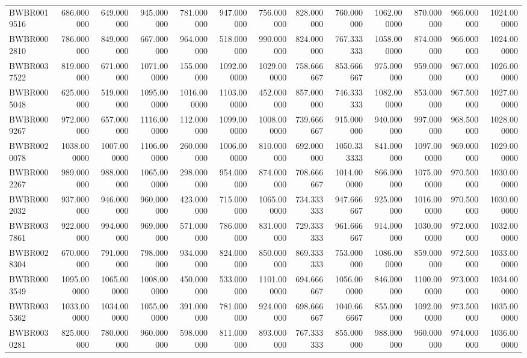 \begin{longtable}{lrrrrrrrrrrrr}
BWBR0019516 & 686.000000 & 649.000000 & 945.000000 & 781.000000 & 947.000000 & 756.000000 & 828.000000 & 760.000000 & 1062.000000 & 870.000000 & 966.000000 & 1024.000000 \\
BWBR0002810 & 786.000000 & 849.000000 & 667.000000 & 964.000000 & 518.000000 & 990.000000 & 824.000000 & 767.333333 & 1058.000000 & 874.000000 & 966.000000 & 1024.000000 \\
BWBR0037522 & 819.000000 & 671.000000 & 1071.000000 & 155.000000 & 1092.000000 & 1029.000000 & 758.666667 & 853.666667 & 975.000000 & 959.000000 & 967.000000 & 1026.000000 \\
BWBR0005048 & 625.000000 & 519.000000 & 1095.000000 & 1016.000000 & 1103.000000 & 452.000000 & 857.000000 & 746.333333 & 1082.000000 & 853.000000 & 967.500000 & 1027.000000 \\
BWBR0009267 & 972.000000 & 657.000000 & 1116.000000 & 112.000000 & 1099.000000 & 1008.000000 & 739.666667 & 915.000000 & 940.000000 & 997.000000 & 968.500000 & 1028.000000 \\
BWBR0020078 & 1038.000000 & 1007.000000 & 1106.000000 & 260.000000 & 1006.000000 & 810.000000 & 692.000000 & 1050.333333 & 841.000000 & 1097.000000 & 969.000000 & 1029.000000 \\
BWBR0002267 & 989.000000 & 988.000000 & 1065.000000 & 298.000000 & 954.000000 & 874.000000 & 708.666667 & 1014.000000 & 866.000000 & 1075.000000 & 970.500000 & 1030.000000 \\
BWBR0002032 & 937.000000 & 946.000000 & 960.000000 & 423.000000 & 715.000000 & 1065.000000 & 734.333333 & 947.666667 & 925.000000 & 1016.000000 & 970.500000 & 1030.000000 \\
BWBR0037861 & 922.000000 & 994.000000 & 969.000000 & 571.000000 & 786.000000 & 831.000000 & 729.333333 & 961.666667 & 914.000000 & 1030.000000 & 972.000000 & 1032.000000 \\
BWBR0028304 & 670.000000 & 791.000000 & 798.000000 & 934.000000 & 824.000000 & 850.000000 & 869.333333 & 753.000000 & 1086.000000 & 859.000000 & 972.500000 & 1033.000000 \\
BWBR0003549 & 1095.000000 & 1065.000000 & 1008.000000 & 450.000000 & 533.000000 & 1101.000000 & 694.666667 & 1056.000000 & 846.000000 & 1100.000000 & 973.000000 & 1034.000000 \\
BWBR0035362 & 1033.000000 & 1034.000000 & 1055.000000 & 391.000000 & 781.000000 & 924.000000 & 698.666667 & 1040.666667 & 855.000000 & 1092.000000 & 973.500000 & 1035.000000 \\
BWBR0030281 & 825.000000 & 780.000000 & 960.000000 & 598.000000 & 811.000000 & 893.000000 & 767.333333 & 855.000000 & 988.000000 & 960.000000 & 974.000000 & 1036.000000 \\

\end{longtable}
